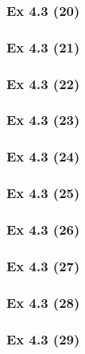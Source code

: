 \subsubsection{Ex 4.3 (20)}\label{sec:Ex_4.3.20}

\newpage		%

\subsubsection{Ex 4.3 (21)}\label{sec:Ex_4.3.21}

\subsubsection{Ex 4.3 (22)}\label{sec:Ex_4.3.22}

\subsubsection{Ex 4.3 (23)}\label{sec:Ex_4.3.23}

\subsubsection{Ex 4.3 (24)}\label{sec:Ex_4.3.24}

\subsubsection{Ex 4.3 (25)}\label{sec:Ex_4.3.25}

\subsubsection{Ex 4.3 (26)}\label{sec:Ex_4.3.26}

\subsubsection{Ex 4.3 (27)}\label{sec:Ex_4.3.27}

\subsubsection{Ex 4.3 (28)}\label{sec:Ex_4.3.28}

\subsubsection{Ex 4.3 (29)}\label{sec:Ex_4.3.29}

